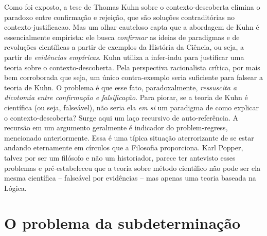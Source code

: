\documentclass[./main.tex]{subfiles}
\begin{document}
\par Como foi exposto, a tese de Thomas Kuhn sobre o \gls{contexto-descoberta} elimina o paradoxo entre confirmação e rejeição, que são soluções contraditórias no \gls{contexto-justificacao}. Mas um olhar cauteloso capta que a abordagem de Kuhn é essencialmente empirista: ele busca \textit{confirmar} as ideias de paradigmas e de revoluções científicas a partir de exemplos da História da Ciência, ou seja, a partir de \textit{evidências empíricas}. Kuhn utiliza a \gls{infer-indu} para justificar uma \gls{teoria} sobre o \gls{contexto-descoberta}. Pela perspectiva racionalista crítica, por mais bem corroborada que seja, um único contra-exemplo seria suficiente para falsear a \gls{teoria} de Kuhn. O problema é que esse fato, paradoxalmente, \textit{ressuscita a dicotomia entre confirmação e falsificação}. Para piorar, se a \gls{teoria} de Kuhn é científica (ou seja, falseável), não seria ela \textit{em si} um \gls{paradigma} de como explicar o \gls{contexto-descoberta}? Surge aqui um laço recursivo de auto-referência. A recursão em um argumento geralmente é indicador do \gls{problem-regress}, mencionado anteriormente. Essa é uma típica situação aterrorizante de se estar andando eternamente em círculos que a Filosofia proporciona. Karl Popper, talvez por ser um filósofo e não um historiador, parece ter antevisto esses problemas e pré-estabeleceu que a \gls{teoria} sobre método científico não pode ser ela mesma científica -- falseável por evidências -- mas apenas uma \gls{teoria} baseada na Lógica.

\section{O problema da subdeterminação} \label{sec:epis:under}
\end{document}
